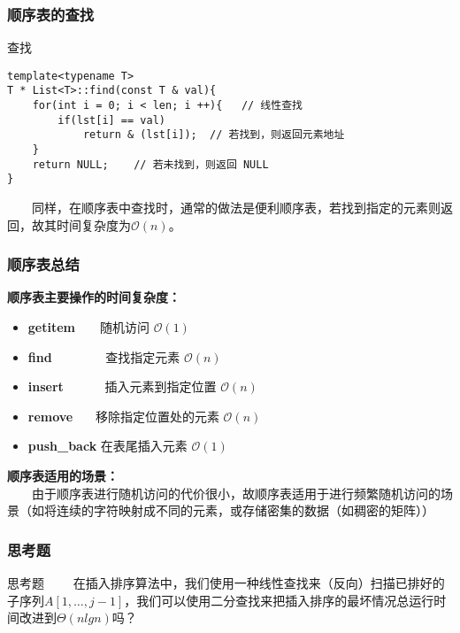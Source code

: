 \documentclass{beamer}
\begin{document}
	\begin{frame}[fragile]\frametitle{顺序表的查找}
		\begin{block}{查找}
\begin{verbatim}
template<typename T>
T * List<T>::find(const T & val){
    for(int i = 0; i < len; i ++){   // 线性查找
        if(lst[i] == val)
            return & (lst[i]);  // 若找到，则返回元素地址
    }
    return NULL;    // 若未找到，则返回 NULL
}
\end{verbatim}
		\end{block}
	\ \ \ \ 同样，在顺序表中查找时，通常的做法是便利顺序表，若找到指定的元素则返回，故其时间复杂度为$\mathcal{O}(n)$。
	\end{frame}

	\begin{frame}\frametitle{顺序表总结}
		\textbf{顺序表主要操作的时间复杂度：}
		\begin{itemize}
			\item \textbf{getitem}\ \ \ \  随机访问 $\mathcal{O}(1)$
			\item \textbf{find} \ \ \ \ \ \ \ \ 查找指定元素 $\mathcal{O}(n)$
			\item \textbf{insert} \ \ \ \ \ \ 插入元素到指定位置 $\mathcal{O}(n)$
			\item \textbf{remove} \ \ \ 移除指定位置处的元素 $\mathcal{O}(n)$
			\item \textbf{push\_back} 在表尾插入元素 $\mathcal{O}(1)$
		\end{itemize} 
		\textbf{顺序表适用的场景：} \\
		\ \ \ \ 由于顺序表进行随机访问的代价很小，故顺序表适用于进行频繁随机访问的场景（如将连续的字符映射成不同的元素，或存储密集的数据（如稠密的矩阵））
	\end{frame}
	\begin{frame}\frametitle{思考题}
		\begin{block}{思考题}
			\ \ \ \ 在插入排序算法中，我们使用一种线性查找来（反向）扫描已排好的子序列$A[1,\dots, j-1]$，我们可以使用二分查找来把插入排序的最坏情况总运行时间改进到$\Theta(nlgn)$吗？
		\end{block}
	\end{frame}
\end{document}
